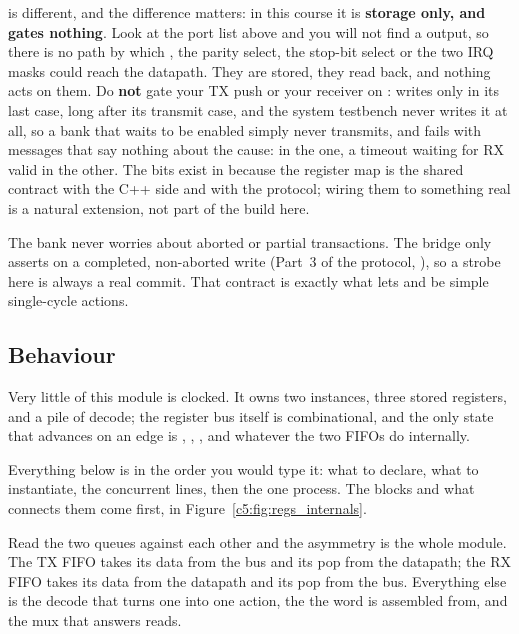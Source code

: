  is different, and the difference matters: in this course it is \textbf{storage only, and
gates nothing}. Look at the port list above and you will not find a  output, so there is
no path by which , the parity select, the stop-bit select or the two IRQ masks could
reach the datapath. They are stored, they read back, and nothing acts on them. Do \textbf{not} gate
your TX push or your receiver on :  writes  only in its last
case, long after its transmit case, and the system testbench  never writes it at
all, so a bank that waits to be enabled simply never transmits, and fails with messages that say
nothing about the cause:  in the one, a timeout
waiting for RX valid in the other. The bits exist in
 because the register map is the shared contract with the C++ side and with the
protocol; wiring them to something real is a natural extension, not part of the build here.

The bank never worries about aborted or partial transactions. The bridge only asserts
 on a completed, non-aborted write (Part~3 of the protocol, ), so
a strobe here is always a real commit. That contract is exactly what lets  and
 be simple single-cycle actions.

\subsection{Behaviour}
\label{c5:sec:uart_regs_behaviour}
Very little of this module is clocked. It owns two  instances, three stored registers,
and a pile of decode; the register bus itself is combinational, and the only state that advances on
an edge is , , , and whatever the two FIFOs do
internally.

Everything below is in the order you would type it: what to declare, what to instantiate, the
concurrent lines, then the one process. The blocks and what connects them come first, in
Figure~\ref{c5:fig:regs_internals}.


Read the two queues against each other and the asymmetry is the whole module. The TX FIFO takes its
data from the bus and its pop from the datapath; the RX FIFO takes its data from the datapath and
its pop from the bus. Everything else is the decode that turns one  into one action,
the  the  word is assembled from, and the mux that answers reads.

